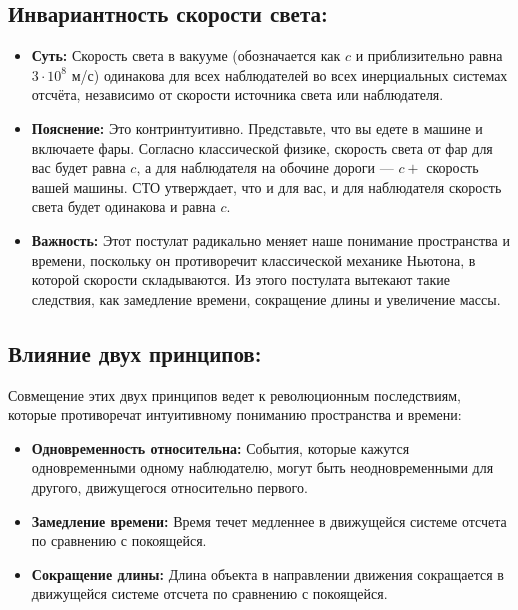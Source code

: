 \documentclass[a4paper,12pt]{article}
\begin{document}
\vspace{-9pt}
\subsection*{Инвариантность скорости света:}
\vspace{-3pt}
\begin{itemize}
    \item \textbf{Суть:} Скорость света в вакууме (обозначается как $c$ и приблизительно равна $3 \cdot 10^8$ м/с) одинакова для всех наблюдателей во всех инерциальных системах отсчёта, независимо от скорости источника света или наблюдателя.
    \item \textbf{Пояснение:} Это контринтуитивно. Представьте, что вы едете в машине и включаете фары. Согласно классической физике, скорость света от фар для вас будет равна $c$, а для наблюдателя на обочине дороги — $c +$ скорость вашей машины. СТО утверждает, что и для вас, и для наблюдателя скорость света будет одинакова и равна $c$.
    \item \textbf{Важность:} Этот постулат радикально меняет наше понимание пространства и времени, поскольку он противоречит классической механике Ньютона, в которой скорости складываются. Из этого постулата вытекают такие следствия, как замедление времени, сокращение длины и увеличение массы.
\end{itemize}

\vspace{-9pt}
\subsection*{Влияние двух принципов:}
\vspace{-3pt}
Совмещение этих двух принципов ведет к революционным последствиям, которые противоречат интуитивному пониманию пространства и времени:
\begin{itemize}
    \item \textbf{Одновременность относительна:} События, которые кажутся одновременными одному наблюдателю, могут быть неодновременными для другого, движущегося относительно первого.
    \item \textbf{Замедление времени:} Время течет медленнее в движущейся системе отсчета по сравнению с покоящейся.
    \item \textbf{Сокращение длины:} Длина объекта в направлении движения сокращается в движущейся системе отсчета по сравнению с покоящейся.
\end{itemize}
\end{document}
